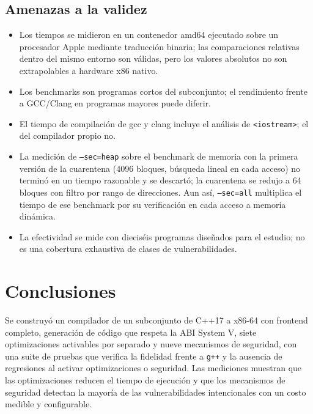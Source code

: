 \documentclass[11pt,a4paper]{article}
\newcommand{\cod}[1]{\texttt{#1}}
\begin{document}
\subsection{Amenazas a la validez}
\begin{itemize}
  \item Los tiempos se midieron en un contenedor amd64 ejecutado sobre un procesador Apple mediante traducción
        binaria; las comparaciones relativas dentro del mismo entorno son válidas, pero los valores absolutos
        no son extrapolables a hardware x86 nativo.
  \item Los benchmarks son programas cortos del subconjunto; el rendimiento frente a GCC/Clang en programas
        mayores puede diferir.
  \item El tiempo de compilación de gcc y clang incluye el análisis de \cod{<iostream>}; el del compilador propio no.
  \item La medición de \cod{--sec=heap} sobre el benchmark de memoria con la primera versión de la cuarentena (4096 bloques,
        búsqueda lineal en cada acceso) no terminó en un tiempo razonable y se descartó; la cuarentena se redujo a 64
        bloques con filtro por rango de direcciones. Aun así, \cod{--sec=all} multiplica el tiempo de ese benchmark
        por su verificación en cada acceso a memoria dinámica.
  \item La efectividad se mide con dieciséis programas diseñados para el estudio; no es una cobertura exhaustiva
        de clases de vulnerabilidades.
\end{itemize}

\section{Conclusiones}
\label{sec:concl}
Se construyó un compilador de un subconjunto de C++17 a x86-64 con frontend completo, generación de código que
respeta la ABI System V, siete optimizaciones activables por separado y nueve mecanismos de seguridad, con una
suite de pruebas que verifica la fidelidad frente a \cod{g++} y la ausencia de regresiones al activar
optimizaciones o seguridad. Las mediciones muestran que las optimizaciones reducen el tiempo de ejecución y que
los mecanismos de seguridad detectan la mayoría de las vulnerabilidades intencionales con un costo medible y
configurable.
\end{document}
